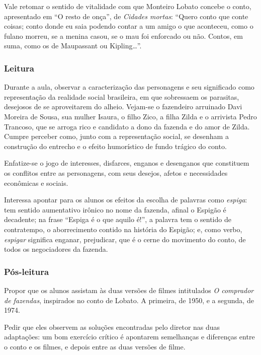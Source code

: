 \documentclass[11pt]{extarticle}
\begin{document}
Vale retomar o sentido de vitalidade com que Monteiro Lobato concebe o
conto, apresentado em ``O resto de onça'', de \emph{Cidades mortas}:
``Quero conto que conte coisas; conto donde eu saia podendo contar a um
amigo o que aconteceu, como o fulano morreu, se a menina casou, se o mau
foi enforcado ou não. Contos, em suma, como os de Maupassant ou
Kipling\ldots{}''.


\subsubsection{Leitura}

Durante a aula, observar a caracterização das personagens e seu significado como
representação da realidade social brasileira, em que sobressaem os
parasitas, desejosos de se aproveitarem do alheio. Vejam-se o fazendeiro
arruinado Davi Moreira de Sousa, sua mulher Isaura, o filho Zico, a
filha Zilda e o arrivista Pedro Trancoso, que se arroga rico e candidato
a dono da fazenda e do amor de Zilda. Cumpre perceber como, junto com a
representação social, se desenham a construção do entrecho e o efeito
humorístico de fundo trágico do conto. 

Enfatize-se o jogo de interesses,
disfarces, enganos e desenganos que constituem os conflitos entre as
personagens, com seus desejos, afetos e necessidades econômicas e
sociais. 


Interessa apontar para os alunos os efeitos da escolha de
palavras como \emph{espiga}: tem sentido aumentativo irônico no nome da
fazenda, afinal o Espigão é decadente; na frase ``Espiga é o que aquilo
é!'', a palavra tem o sentido de contratempo, o aborrecimento contido na
história do Espigão; e, como verbo, \emph{espigar} significa enganar,
prejudicar, que é o cerne do movimento do conto, de todos os
negociadores da fazenda.

\subsubsection{Pós-leitura}

Propor que os alunos assistam às duas versões de filmes intitulados
\emph{O comprador de fazendas}, inspirados no conto de Lobato. A
primeira, de 1950, e a segunda, de 1974.

Pedir que eles observem as soluções encontradas pelo diretor nas duas
adaptações: um bom exercício crítico é apontarem semelhanças e
diferenças entre o conto e os filmes, e depois entre as duas versões de
filme.
\end{document}
